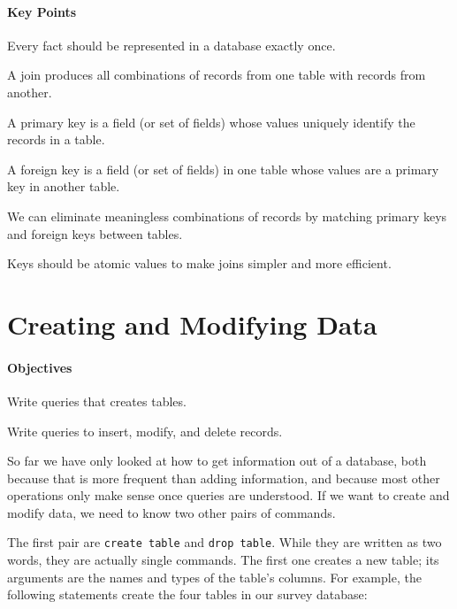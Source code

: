 \documentclass{book}
\begin{document}
\mbox{}\paragraph{Key Points}

\begin{swcitemize}
\item
  Every fact should be represented in a database exactly once.
\item
  A join produces all combinations of records from one table with
  records from another.
\item
  A primary key is a field (or set of fields) whose values uniquely
  identify the records in a table.
\item
  A foreign key is a field (or set of fields) in one table whose values
  are a primary key in another table.
\item
  We can eliminate meaningless combinations of records by matching
  primary keys and foreign keys between tables.
\item
  Keys should be atomic values to make joins simpler and more efficient.
\end{swcitemize}

\section{Creating and Modifying Data}

\mbox{}\paragraph{Objectives}

\begin{swcitemize}
\item
  Write queries that creates tables.
\item
  Write queries to insert, modify, and delete records.
\end{swcitemize}

So far we have only looked at how to get information out of a database,
both because that is more frequent than adding information, and because
most other operations only make sense once queries are understood. If we
want to create and modify data, we need to know two other pairs of
commands.

The first pair are \texttt{create table} and \texttt{drop table}. While
they are written as two words, they are actually single commands. The
first one creates a new table; its arguments are the names and types of
the table's columns. For example, the following statements create the
four tables in our survey database:
\end{document}
